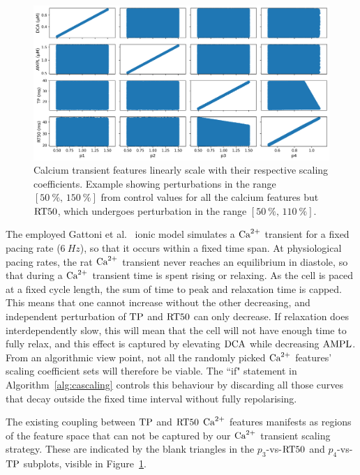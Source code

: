 \begin{figure}[ht!]
    \myfloatalign
    \includegraphics[width=\textwidth]{figures/chapter06/p_vs_b.png}
    \caption{Calcium transient features linearly scale with their respective scaling coefficients. Example showing perturbations in the range $[\SI{50}{\percent},\,\SI{150}{\percent}]$ from control values for all the calcium features but $\textrm{RT50}$, which undergoes perturbation in the range $[\SI{50}{\percent},\,\SI{110}{\percent}]$.}
    \label{fig:scalersvscafeatures}
\end{figure}

\vspace{0.2cm}
The employed Gattoni et al.~\cite{Gattoni:2017} ionic model simulates a $\textrm{Ca}^{2+}$ transient for a fixed pacing rate ($\SI{6}{Hz}$), so that it occurs within a fixed time span. At physiological pacing rates, the rat $\textrm{Ca}^{2+}$ transient never reaches an equilibrium in diastole, so that during a $\textrm{Ca}^{2+}$ transient time is spent rising or relaxing. As the cell is paced at a fixed cycle length, the sum of time to peak and relaxation time is capped. This means that one cannot increase without the other decreasing, and independent perturbation of $\textrm{TP}$ and $\textrm{RT50}$ can only decrease. If relaxation does interdependently slow, this will mean that the cell will not have enough time to fully relax, and this effect is captured by elevating $\textrm{DCA}$ while decreasing $\textrm{AMPL}$. From an algorithmic view point, not all the randomly picked $\textrm{Ca}^{2+}$ features' scaling coefficient sets will therefore be viable. The ``if" statement in Algorithm~\ref{alg:cascaling} controls this behaviour by discarding all those curves that decay outside the fixed time interval without fully repolarising.

\vspace{0.2cm}
The existing coupling between $\textrm{TP}$ and $\textrm{RT50}$ $\textrm{Ca}^{2+}$ features manifests as regions of the feature space that can not be captured by our $\textrm{Ca}^{2+}$ transient scaling strategy. These are indicated by the blank triangles in the $p_3$-vs-$\textrm{RT50}$ and $p_4$-vs-$\textrm{TP}$ subplots, visible in Figure~\ref{fig:scalersvscafeatures}.


